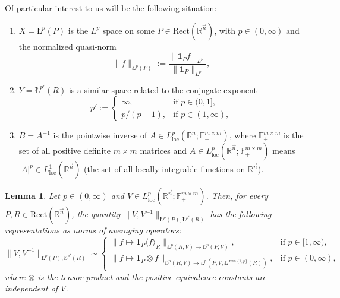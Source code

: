 \documentclass[11pt, reqno]{amsart}
\newtheorem{lemma}[theorem]{Lemma}
\theoremstyle{definition}
\theoremstyle{remark}
\numberwithin{equation}{section}
\newcommand{\F}{\mathbb F}
\newcommand{\R}{\mathbb R}
\newcommand{\vn}{\vec n}
\newcommand{\one}{\mathbf{1}}
\newcommand{\loc}{\mathrm{loc}}
\newcommand{\ave}[1]{\langle #1\rangle}
\newcommand{\aveL}{\textit{\L}}
\newcommand{\Norm}[2]{\|#1\|_{#2}}
\newcommand{\Rect}{\mathrm{Rect}}
\newcommand{\pdef}[1]{\F^{#1\times #1}_+}
\begin{document}
Of particular interest to us will be the following situation:
\begin{enumerate}[\rm(i)]
\item $X=\aveL^{p}(P)$ is the $L^{p}$ space on some $P\in\Rect(\R^{\vn})$, with $p\in(0,\infty)$ and the normalized quasi-norm
\begin{equation*}
\Norm{f}{\aveL^{p}(P)}:=\frac{\Norm{\one_P f}{L^{p}}}{\Norm{\one_P}{L^{p}}},
\end{equation*}

\item $Y=\aveL^{p'}(R)$ is a similar space related to the conjugate exponent
\begin{equation*}
p':=\begin{cases}\infty, & \text{if }p\in(0,1], \\ p/(p-1), & \text{if }p\in(1,\infty),
\end{cases}
\end{equation*}

\item $B=A^{-1}$ is the pointwise inverse of $A\in L_{\loc}^{p}(\R^n;\pdef{m})$, where $\pdef{m}$ is the set of all positive definite $m\times m$ matrices
and $A\in L_{\loc}^{p}(\R^{\vn};\pdef{m})$ means $|A|^p\in L_{\loc}^1(\R^{\vn})$
(the set of all locally integrable functions on $\R^{\vn}$).
\end{enumerate}

\begin{lemma}\label{ave ops}
Let $p\in(0,\infty)$ and $V\in L_{\loc}^p(\R^{\vec n};\F_+^{m\times m})$.
Then, for every $P,R\in\Rect(\R^{\vn})$,
the quantity $\Norm{V,V^{-1}}{\aveL^p(P),\aveL^{p'}(R)}$
has the following representations as norms of averaging operators:
\begin{equation} \label{1.29}
\Norm{V,V^{-1}}{\aveL^p(P),\aveL^{p'}(R)}
\sim\begin{cases}
\Norm{f\mapsto\one_P\ave{f}_R}{\aveL^{p}(R,V)\to\aveL^p(P,V)},
& \text{if } p\in[1,\infty), \\
\Norm{f\mapsto \one_P\otimes f}{\aveL^p(R,V)\to\aveL^p(P,V;\aveL^{\min\{1,p\}}(R))},
&  \text{if } p\in(0,\infty),
\end{cases}
\end{equation}
where $\otimes$ is the tensor product and
the positive equivalence constants are independent of $V$.
\end{lemma}
\end{document}
